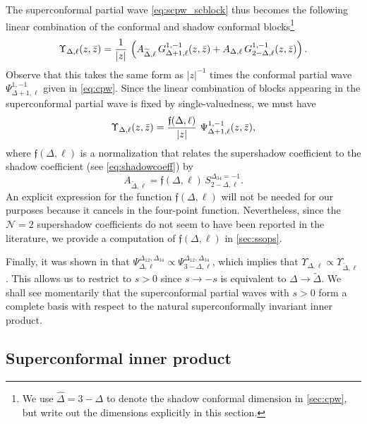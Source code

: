 \documentclass[11pt]{article}
\newcommand{\zb}{\bar{z}}
\begin{document}
The superconformal partial wave \eqref{eq:scpw_scblock} thus becomes the following linear combination of the conformal and shadow conformal blocks\footnote{ We use $\hat{\Delta} = 3-\Delta$ to denote the shadow conformal dimension in \cref{sec:cpw}, but write out the dimensions explicitly in this section.}  
%
\begin{equation}\label{eq:scpw_scblock2}
\Upsilon_{\Delta,\ell}(z,\zb) = \frac{1}{\abs{z}}\, \left(A_{\widetilde{\Delta},\ell}\, G_{\Delta+1,\ell}^{1,-1}(z,\zb) + A_{\Delta,\ell}\, G_{2-\Delta,\ell}^{1,-1}(z,\zb)\right).
\end{equation}
%
Observe that this takes the same form as $|z|^{-1}$ times the conformal partial wave $\Psi_{\Delta+1,\ell}^{1,-1}$ given in \eqref{eq:cpw}. Since the linear combination of blocks appearing in the superconformal partial wave is fixed by single-valuedness, we must have
%
\begin{equation}\label{eq:scpw_cpw}
\Upsilon_{\Delta,\ell}(z,\zb) =  \frac{ \mathfrak{f}(\Delta,\ell)}{\abs{z}}\, \, \Psi_{\Delta+1,\ell}^{1,-1}(z,\zb),
\end{equation}
%
where $\mathfrak{f}(\Delta,\ell)$ is a normalization that relates the supershadow coefficient to the shadow coefficient (see \eqref{eq:shadowcoeff}) by
\begin{equation}\label{eq:fdef}
A_{\widetilde{\Delta},\ell} = \mathfrak{f}(\Delta,\ell) \, S_{2-\Delta,\ell}^{\Delta_{34}=-1}.
\end{equation}
%
An explicit expression for the function $\mathfrak{f}(\Delta,\ell)$ will not be needed for our purposes because it cancels in the four-point function. Nevertheless,  since the $\mathcal{N}=2$ supershadow coefficients do not seem to have been reported in the literature, we provide a computation of $\mathfrak{f}(\Delta,\ell)$ in \cref{sec:ssops}.

Finally, it was shown in \cite{Simmons-Duffin:2017nub} that $\Psi_{\Delta,\ell}^{\Delta_{12},\Delta_{34}} \propto \Psi_{3-\Delta,\ell}^{\Delta_{12},\Delta_{34}}$, which implies that $\Upsilon_{\Delta,\ell} \propto \Upsilon_{\widetilde{\Delta},\ell}$. This allows us to restrict to $s>0$ since $s \to -s$ is equivalent to $\Delta \to \widetilde{\Delta}$. We shall see momentarily that the superconformal partial waves with $s>0$ form a complete basis with respect to the natural superconformally invariant inner product.  

\subsection{Superconformal inner product}
\label{sec:ip}
\end{document}
